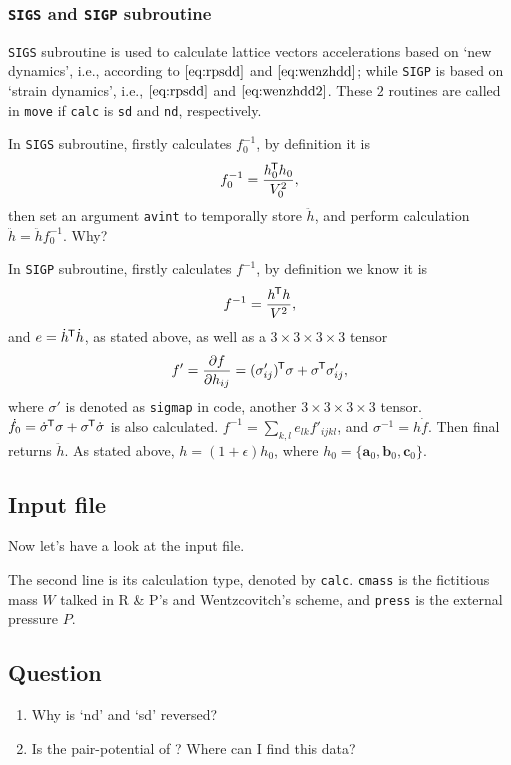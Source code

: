 \subsubsection{\texttt{SIGS} and \texttt{SIGP} subroutine}

\texttt{SIGS} subroutine is used to calculate lattice vectors accelerations
based on `new dynamics', i.e., according to $\eqref{eq:rpsdd}$ and
$\eqref{eq:wenzhdd}$; while \texttt{SIGP} is based on `strain dynamics',
i.e., $\eqref{eq:rpsdd}$ and $\eqref{eq:wenzhdd2}$. These $2$ routines
are called in \texttt{move} if \texttt{calc} is \texttt{sd} and \texttt{nd}, respectively.

In \texttt{SIGS} subroutine,
firstly calculates $f_0^{-1}$, by definition it is
\begin{equation}
  f_0^{-1} = \frac{ h_0 ^{\mkern-1.5mu\mathsf{T}} h_0}{ V_0^2 },
\end{equation}
then set an argument \texttt{avint} to temporally store $\ddot{h}$,
and perform calculation $\ddot{h} = \ddot{h} f_0^{-1}$. Why?


In \texttt{SIGP} subroutine,
firstly calculates $f^{-1}$, by definition we know it is
\begin{equation}
	f^{-1} = \frac{ h ^{\mkern-1.5mu\mathsf{T}} h }{ V^2 },
\end{equation}
and $e = \dot{ h }^{\mkern-1.5mu\mathsf{T}} \dot{ h }$, as stated above, as well as
a $3\times 3 \times 3 \times 3$ tensor
\begin{equation}
	f ' = \frac{ \partial f }{ \partial h_{ij} } = (\sigma'_{ij})^{\mkern-1.5mu\mathsf{T}} \sigma
	+ \sigma ^{\mkern-1.5mu\mathsf{T}} \sigma'_{ij},
\end{equation}
where $\sigma'$ is denoted as \texttt{sigmap} in code, another $3\times 3
\times 3 \times 3$ tensor.
$\dot{f}_0 = \dot{ \sigma } ^{\mkern-1.5mu\mathsf{T}} \sigma + \sigma ^{\mkern-1.5mu\mathsf{T}} \dot{ \sigma }$ is
also calculated.
$f^{-1} = \sum_{k, l} e_{lk} f'_{ijkl}$, and $\sigma^{-1} = h \dot{ f }$.
Then final returns $\ddot{h}$. As stated above, $h = (1 + \epsilon) h_0$,
where $h_0 = \{ \bm{a}_0, \bm{b}_0, \bm{c}_0 \}$.


\subsection{Input file}

Now let's have a look at the input file.

The second line is its calculation type, denoted by
\texttt{calc}. \texttt{cmass} is the fictitious mass $W$ talked
in R & P's and Wentzcovitch's scheme, and \texttt{press} is the
external pressure $P$.


\subsection{Question}

\begin{enumerate}
	\item Why is `nd' and `sd' reversed?
	\item Is the pair-potential of ? Where can I find this
	data?
\end{enumerate}
